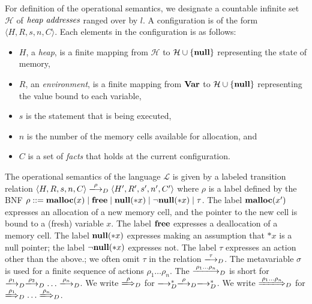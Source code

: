 For definition of the operational semantics, we designate a countable
infinite set \(\mathcal{H}\) of \(\emph{heap addresses}\) ranged over by
\(l\).  A configuration is of the form \(\langle H, R, s, n, C
\rangle\).  Each elements in the configuration is as follows:
\begin{itemize}
\item \(H\), a \emph{heap}, is a finite mapping from \(\mathcal{H}\) to
  \(\mathcal{H} \cup \{\mathbf{null}\}\) representing the state of memory,
\item \(R\), an \emph{environment}, is a finite mapping from \(\mathbf{Var}\)
  to \(\mathcal{H} \cup \{\mathbf{null}\}\) representing the value bound to
      each variable,
\item \(s\) is the statement that is being executed,
\item \(n\) is the number of the memory cells available for allocation,
      and
\item \(C\) is a set of \emph{facts} that holds at the current configuration.
\end{itemize}

The operational semantics of the language \(\mathcal{L}\) is given by a
labeled transition relation \(\langle H, R, s, n, C \rangle
\xlongrightarrow{\rho}_D \langle H', R', s', n', C' \rangle\) where
\(\rho\) is a label defined by the BNF $\rho ::= \mathbf{malloc}(x) \mid \mathbf{free}
\mid \mathbf{null}(*x) \mid \neg\mathbf{null}(*x) \mid \tau$.  The label \(\mathbf{malloc}(x')\)
expresses an allocation of a new memory cell, and the pointer to the new
cell is bound to a (fresh) variable \(x\).  The label \(\mathbf{free}\)
expresses a deallocation of a memory cell.  The label \(\mathbf{null}(*x)\)
expresses making an assumption that \(*x\) is a null pointer; the label
$\neg\mathbf{null}(*x)$ expresses not.  The label \(\tau\) expresses an action other
than the above.; we often omit \(\tau\) in the relation
\(\xlongrightarrow{\tau}_D\).  The metavariable \(\sigma\) is used for a
finite sequence of actions \(\rho_1\dots\rho_n\). The
\(\xlongrightarrow{\rho_1\dots\rho_n}_D\) is short for
\(\xlongrightarrow{\rho_1}_D\xlongrightarrow{\rho_2}_D\dots\xlongrightarrow{\rho_n}_D\).
We write \(\xLongrightarrow{\rho}_D\) for
\(\xlongrightarrow{}_D^*\xlongrightarrow{\rho}_D\xlongrightarrow{}_D^*\).
We write \(\xLongrightarrow{\rho_1\dots\rho_n}_D\) for
\(\xLongrightarrow{\rho_1}_D\dots\xLongrightarrow{\rho_n}_D\).

